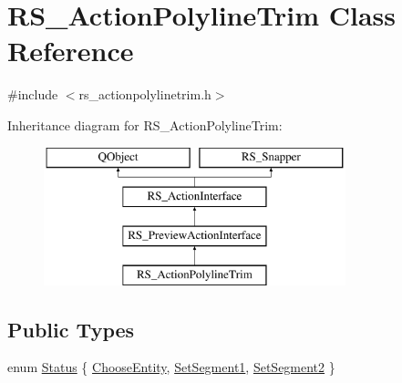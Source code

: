 \hypertarget{classRS__ActionPolylineTrim}{\section{R\-S\-\_\-\-Action\-Polyline\-Trim Class Reference}
\label{classRS__ActionPolylineTrim}
}


{\ttfamily \#include $<$rs\-\_\-actionpolylinetrim.\-h$>$}

Inheritance diagram for R\-S\-\_\-\-Action\-Polyline\-Trim\-:\begin{figure}[H]
\begin{center}
\leavevmode
\includegraphics[height=4.000000cm]{classRS__ActionPolylineTrim}
\end{center}
\end{figure}
\subsection*{Public Types}
\begin{DoxyCompactItemize}
\item 
enum \hyperlink{classRS__ActionPolylineTrim_aae6f7dce1bf9306a4d1dcfec21b13ca0}{Status} \{ \hyperlink{classRS__ActionPolylineTrim_aae6f7dce1bf9306a4d1dcfec21b13ca0a99c01c12178b831d025bd3b9d973072f}{Choose\-Entity}, 
\hyperlink{classRS__ActionPolylineTrim_aae6f7dce1bf9306a4d1dcfec21b13ca0a93c41f6be5213e60881f9165f9c44413}{Set\-Segment1}, 
\hyperlink{classRS__ActionPolylineTrim_aae6f7dce1bf9306a4d1dcfec21b13ca0a4b0e624cf8f89c97158e1bfbbc115ea3}{Set\-Segment2}
 \}
\end{DoxyCompactItemize}
